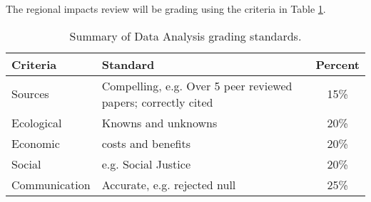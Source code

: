 The regional impacts review will be grading using the criteria in Table \ref{tab:regionalimpactsgrading}.

\begin{table}[h]
\caption{Summary of Data Analysis grading standards.}
\label{tab:regionalimpactsgrading}
\begin{tabular}{llc}\hline
Criteria            &   Standard    & Percent \\ \hline\hline
Sources     & Compelling, e.g. Over 5 peer reviewed papers; correctly cited & 15\% \\
Ecological  & Knowns and unknowns             & 20\% \\
Economic    & costs and benefits              & 20\% \\
Social      & e.g. Social Justice             & 20\% \\
Communication    & Accurate, e.g. rejected null   & 25\% \\

\hline
\end{tabular}
\end{table}